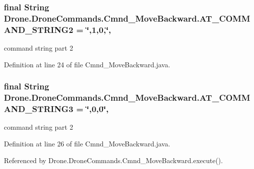 \subsubsection[{A\+T\+\_\+\+C\+O\+M\+M\+A\+N\+D\+\_\+\+S\+T\+R\+I\+N\+G2}]{\setlength{\rightskip}{0pt plus 5cm}final String Drone.\+Drone\+Commands.\+Cmnd\+\_\+\+Move\+Backward.\+A\+T\+\_\+\+C\+O\+M\+M\+A\+N\+D\+\_\+\+S\+T\+R\+I\+N\+G2 = \char`\"{},1,0,\char`\"{}\hspace{0.3cm}{\ttfamily [static]}, {\ttfamily [private]}}\label{class_drone_1_1_drone_commands_1_1_cmnd___move_backward_a47f8174531dc5dd1d91dc8a2d42ada5d}
command string part 2 

Definition at line 24 of file Cmnd\+\_\+\+Move\+Backward.\+java.

\hypertarget{class_drone_1_1_drone_commands_1_1_cmnd___move_backward_a7d2de3cf241b958ba196187bbb4d76cb}{}
\subsubsection[{A\+T\+\_\+\+C\+O\+M\+M\+A\+N\+D\+\_\+\+S\+T\+R\+I\+N\+G3}]{\setlength{\rightskip}{0pt plus 5cm}final String Drone.\+Drone\+Commands.\+Cmnd\+\_\+\+Move\+Backward.\+A\+T\+\_\+\+C\+O\+M\+M\+A\+N\+D\+\_\+\+S\+T\+R\+I\+N\+G3 = \char`\"{},0,0\char`\"{}\hspace{0.3cm}{\ttfamily [static]}, {\ttfamily [private]}}\label{class_drone_1_1_drone_commands_1_1_cmnd___move_backward_a7d2de3cf241b958ba196187bbb4d76cb}
command string part 2 

Definition at line 26 of file Cmnd\+\_\+\+Move\+Backward.\+java.



Referenced by Drone.\+Drone\+Commands.\+Cmnd\+\_\+\+Move\+Backward.\+execute().

\hypertarget{class_drone_1_1_drone_commands_1_1_cmnd___move_backward_a5cf26b01ac06582a0f4266dc43636472}{}
